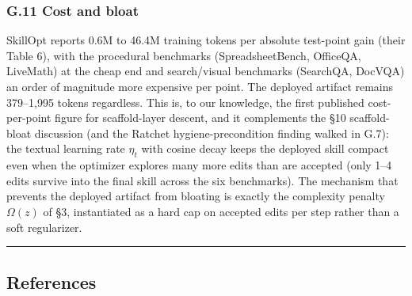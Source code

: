 \documentclass[
]{article}
\begin{document}
\subsubsection{G.11 Cost and bloat}\label{g.11-cost-and-bloat}

SkillOpt reports 0.6M to 46.4M training tokens per absolute test-point
gain (their Table 6), with the procedural benchmarks (SpreadsheetBench,
OfficeQA, LiveMath) at the cheap end and search/visual benchmarks
(SearchQA, DocVQA) an order of magnitude more expensive per point. The
deployed artifact remains 379--1,995 tokens regardless. This is, to our
knowledge, the first published cost-per-point figure for scaffold-layer
descent, and it complements the §10 scaffold-bloat discussion (and the
Ratchet hygiene-precondition finding walked in G.7): the textual
learning rate \(\eta_t\) with cosine decay keeps the deployed skill
compact even when the optimizer explores many more edits than are
accepted (only 1--4 edits survive into the final skill across the six
benchmarks). The mechanism that prevents the deployed artifact from
bloating is exactly the complexity penalty \(\Omega(z)\) of §3,
instantiated as a hard cap on accepted edits per step rather than a soft
regularizer.

\begin{center}\rule{0.5\linewidth}{0.5pt}\end{center}

\subsection{References}\label{references}
\end{document}
